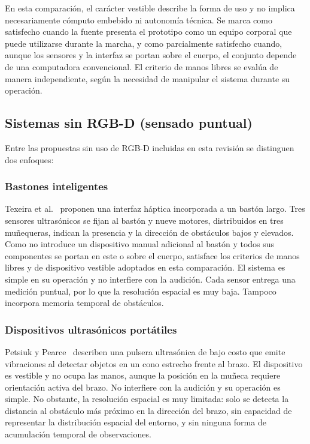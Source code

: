 \begin{samepage}
En esta comparación, el carácter vestible describe la forma de uso y no implica necesariamente
cómputo embebido ni autonomía técnica. Se marca como satisfecho cuando la fuente presenta el
prototipo como un equipo corporal que puede utilizarse durante la marcha, y como parcialmente
satisfecho cuando, aunque los sensores y la interfaz se portan sobre el cuerpo, el conjunto depende
de una computadora convencional. El criterio de manos libres se evalúa de manera independiente,
según la necesidad de manipular el sistema durante su operación.

\end{samepage}

\subsection{Sistemas sin RGB-D (sensado puntual)}
\label{subsec:ea-propuestas}

Entre las propuestas sin uso de RGB-D incluidas en esta revisión se distinguen dos enfoques:

\subsubsection{Bastones inteligentes}
\label{subsec:ea-bastones}

Texeira et al.~\cite{Santos2023} proponen una interfaz háptica incorporada a un bastón largo. Tres
sensores ultrasónicos se fijan al bastón y nueve motores, distribuidos en tres muñequeras, indican
la presencia y la dirección de obstáculos bajos y elevados. Como no introduce un dispositivo
manual adicional al bastón y todos sus componentes se portan en este o sobre el cuerpo, satisface
los criterios de manos libres y de dispositivo vestible adoptados en esta comparación. El sistema
es simple en su operación y no interfiere con la audición. Cada sensor entrega una medición puntual,
por lo que la resolución espacial es muy baja. Tampoco incorpora memoria temporal de obstáculos.

\subsubsection{Dispositivos ultrasónicos portátiles}
\label{subsec:ea-ultrasonicos}

Petsiuk y Pearce~\cite{Petsiuk2019UltrasoundNavigation} describen una pulsera ultrasónica de bajo
costo que emite vibraciones al detectar objetos en un cono estrecho frente al brazo. El dispositivo
es vestible y no ocupa las manos, aunque la posición en la muñeca requiere orientación
activa del brazo. No interfiere con la audición y su operación es simple. No obstante, la
resolución espacial es muy limitada: solo se detecta la distancia al obstáculo más próximo en
la dirección del brazo, sin capacidad de representar la distribución espacial del entorno, y sin
ninguna forma de acumulación temporal de observaciones.

